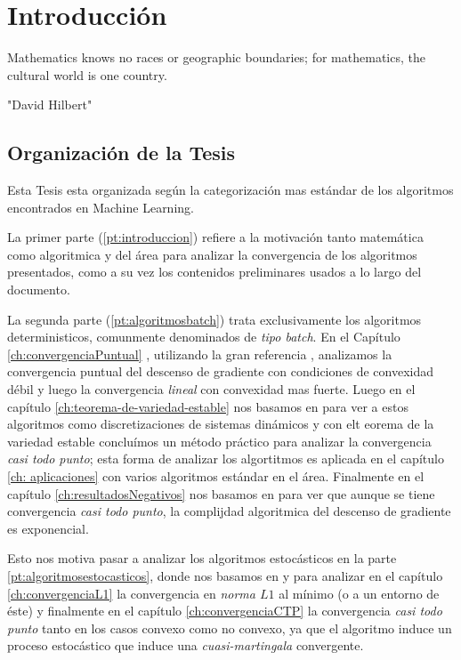 \chapter{Introducci\'on}\label{ch:introduccion}

\epigraph{Mathematics knows no races
	or geographic boundaries;
	for mathematics,
	the cultural world
	is one country.}{"David Hilbert"}

\section{Organizaci\'on de la Tesis}

Esta Tesis esta organizada seg\'un la categorizaci\'on mas est\'andar de los algoritmos encontrados en Machine Learning.

La primer parte (\ref{pt:introduccion}) refiere a la motivaci\'on tanto matem\'atica como algoritmica y del \'area para analizar la convergencia de los algoritmos presentados, como a su vez los contenidos preliminares usados a lo largo del documento.

La segunda parte (\ref{pt:algoritmosbatch}) trata exclusivamente los algoritmos deterministicos, comunmente denominados de \textit{tipo batch}. En el Cap\'itulo \ref{ch:convergenciaPuntual} , utilizando la gran referencia \cite{nesterov:2004}, analizamos la convergencia puntual del descenso de gradiente con condiciones de convexidad d\'ebil y luego la convergencia \textit{lineal} con convexidad mas fuerte. Luego en el cap\'itulo \ref{ch:teorema-de-variedad-estable} nos basamos en \cite{lee:2017} para ver a estos algoritmos como discretizaciones de sistemas din\'amicos y con elt eorema de la variedad estable conclu\'imos un m\'etodo pr\'actico para analizar la convergencia \textit{casi todo punto}; esta forma de analizar los algortitmos es aplicada en el cap\'itulo \ref{ch: aplicaciones} con varios algoritmos est\'andar en el \'area. Finalmente en el cap\'itulo \ref{ch:resultadosNegativos} nos basamos en \cite{du:2017} para ver que aunque se tiene convergencia \textit{casi todo punto}, la complijdad algoritmica del descenso de gradiente es exponencial.

Esto nos motiva pasar a analizar los algoritmos estoc\'asticos en la parte \ref{pt:algoritmosestocasticos}, donde nos basamos en \cite{bottou:1999} y \cite{bottou:2016} para analizar en el cap\'itulo \ref{ch:convergenciaL1} la convergencia en \textit{norma $L1$} al m\'inimo (o a un entorno de \'este) y finalmente en el cap\'itulo \ref{ch:convergenciaCTP} la convergencia \textit{casi todo punto} tanto en los casos convexo como no convexo, ya que el algoritmo induce un proceso estoc\'astico que induce una \textit{cuasi-martingala} convergente.

\smallskip
